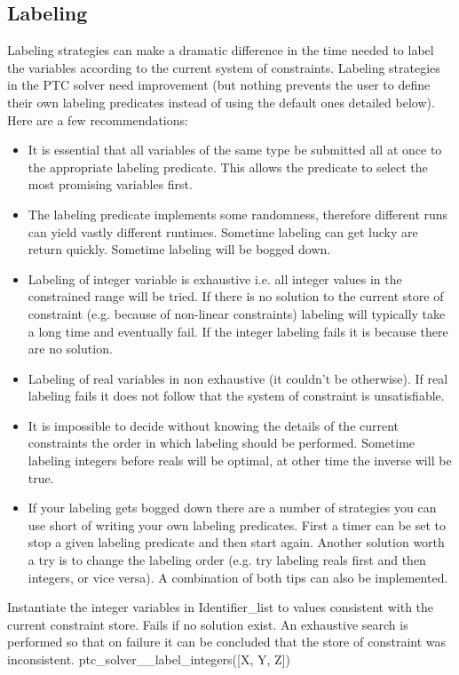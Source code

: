 \documentclass{article}
\begin{document}
\subsection{Labeling}
Labeling strategies can make a dramatic difference in the time needed to label
the variables according to the current system of constraints. Labeling strategies
in the PTC solver need improvement (but nothing prevents the user to define their
own labeling predicates instead of using the default ones detailed below). Here
are a few recommendations:
\begin{itemize}
\item It is essential that all variables of the same type be submitted all at
once to the appropriate labeling predicate. This allows the predicate to select
the most promising variables first.
\item The labeling predicate implements some randomness, therefore different runs
can yield vastly different runtimes. Sometime labeling can get lucky are return
quickly. Sometime labeling will be bogged down.
\item Labeling of integer variable is exhaustive i.e. all integer values in the
constrained range will be tried. If there is no solution to the current store of
constraint (e.g. because of non-linear constraints) labeling will typically take
a long time and eventually fail. If the integer labeling fails it is because
there are no solution.
\item Labeling of real variables in non exhaustive (it couldn't be otherwise). If
real labeling fails it does not follow that the system of constraint is
unsatisfiable.
\item It is impossible to decide without knowing the details of the current
constraints the order in which labeling should be performed. Sometime labeling
integers before reals will be optimal, at other time the inverse will be true.
\item If your labeling gets bogged down there are a number of strategies you can
use short of writing your own labeling predicates. First a timer can be set to
stop a given labeling predicate and then start again. Another solution worth a
try is to change the labeling order (e.g. try labeling reals first and then
integers, or vice versa). A combination of both tips can also be implemented.
\end{itemize}


    {Instantiate the integer variables in Identifier\_list to values
consistent with
    the current constraint store. Fails if no solution exist. An exhaustive
search is performed so that on failure it can be concluded that the store
of constraint was inconsistent.}
    {ptc\_solver\_\_label\_integers([X, Y, Z])}
    {}
\end{document}
